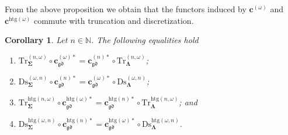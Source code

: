 \documentclass[a4paper, reqno]{amsbook}
\newcommand{\sig}[1]{\mathbf{#1}}             %
\newcommand{\gd}{\mathfrak{gd}}              %
\newcommand{\htg}{\mathrm{htg}}                %
\newcommand{\Ds}{\mathrm{Ds}}
\newcommand{\Tr}{\mathrm{Tr}}
\theoremstyle{plain}
\newtheorem{corollary}[theorem]{Corollary}
\theoremstyle{definition}
\begin{document}
From the above proposition we obtain that the functors induced by $\mathbf{c}^{(\omega)}$ and $\mathbf{c}^{\htg(\omega)}$ commute with truncation and discretization.

\begin{corollary}\label{CChangeSigDsTrOmega}
Let $n\in\mathbb{N}$.
The following equalities hold
\begin{enumerate}
	\item
	$\Tr^{(n,\omega)}_{\sig{\Sigma}}\circ\mathbf{c}^{(\omega)\ast}_{\gd}=\mathbf{c}^{(n)\ast}_{\gd}\circ\Tr^{(n,\omega)}_{\sig{\Lambda}}$;

	\item
	$\Ds^{(\omega,n)}_{\sig{\Sigma}}\circ\mathbf{c}^{(n)\ast}_{\gd}=\mathbf{c}^{(\omega)\ast}_{\gd}\circ\Ds^{(\omega,n)}_{\sig{\Lambda}}$;

	\item
	$\Tr^{\htg(n,\omega)}_{\sig{\Sigma}}\circ\mathbf{c}^{\htg(\omega)\ast}_{\gd}=\mathbf{c}^{\htg(n)\ast}_{\gd}\circ\Tr^{\htg(n,\omega)}_{\sig{\Lambda}}$; and

	\item
	$\Ds^{\htg(\omega,n)}_{\sig{\Sigma}}\circ\mathbf{c}^{\htg(n)\ast}_{\gd}=\mathbf{c}^{\htg(\omega)\ast}_{\gd}\circ\Ds^{\htg(\omega,n)}_{\sig{\Lambda}}$.
\end{enumerate}
\end{corollary}
\end{document}
